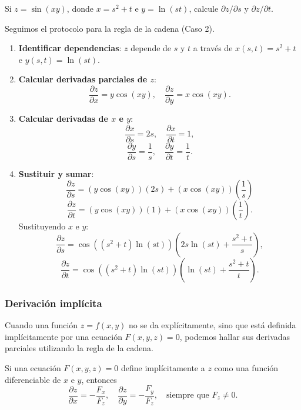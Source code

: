 \begin{example}
Si $z = \sin(xy)$, donde $x = s^2 + t$ e $y = \ln(s t)$, calcule $\partial z/\partial s$ y $\partial z/\partial t$.
\end{example}
\begin{myproof}
Seguimos el protocolo para la regla de la cadena (Caso 2).
\begin{enumerate}
    \item \textbf{Identificar dependencias}: $z$ depende de $s$ y $t$ a través de $x(s,t) = s^2 + t$ e $y(s,t) = \ln(st)$.
    \item \textbf{Calcular derivadas parciales de $z$}:
    \[
    \frac{\partial z}{\partial x} = y \cos(xy), \quad \frac{\partial z}{\partial y} = x \cos(xy).
    \]
    \item \textbf{Calcular derivadas de $x$ e $y$}:
    \[
    \frac{\partial x}{\partial s} = 2s, \quad \frac{\partial x}{\partial t} = 1,
    \]
    \[
    \frac{\partial y}{\partial s} = \frac{1}{s}, \quad \frac{\partial y}{\partial t} = \frac{1}{t}.
    \]
    \item \textbf{Sustituir y sumar}:
    \[
    \frac{\partial z}{\partial s} = (y \cos(xy))(2s) + (x \cos(xy))\left(\frac{1}{s}\right)
    \]
    \[
    \frac{\partial z}{\partial t} = (y \cos(xy))(1) + (x \cos(xy))\left(\frac{1}{t}\right).
    \]
    Sustituyendo $x$ e $y$:
    \[
    \frac{\partial z}{\partial s} = \boxed{\cos((s^2+t)\ln(st))\left(2s \ln(st) + \frac{s^2+t}{s}\right)},
    \]
    \[
    \frac{\partial z}{\partial t} = \boxed{\cos((s^2+t)\ln(st))\left(\ln(st) + \frac{s^2+t}{t}\right)}.
    \]
\end{enumerate}
\end{myproof}

\subsubsection{Derivación implícita}

Cuando una función $z = f(x, y)$ no se da explícitamente, sino que está definida implícitamente por una ecuación $F(x, y, z) = 0$, podemos hallar sus derivadas parciales utilizando la regla de la cadena.

\begin{theorem}
Si una ecuación $F(x, y, z) = 0$ define implícitamente a $z$ como una función diferenciable de $x$ e $y$, entonces
\[
\frac{\partial z}{\partial x} = -\frac{F_x}{F_z}, \quad \frac{\partial z}{\partial y} = -\frac{F_y}{F_z}, \quad \text{siempre que } F_z \neq 0.
\]
\end{theorem}

